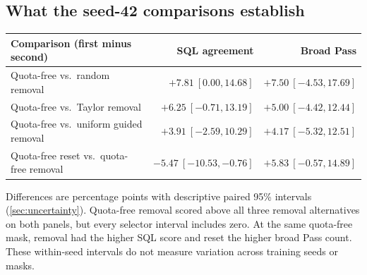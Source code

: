 \documentclass[10pt,letterpaper]{article}
\begin{document}
\subsection{What the seed-42 comparisons establish}
\label{app:paired-comparisons}

\begin{center}
\small
\begin{tabular}{@{}lrr@{}}
\toprule
Comparison (first minus second) & SQL agreement & Broad Pass\\
\midrule
Quota-free vs.\ random removal & $+7.81\ [0.00,14.68]$ & $+7.50\ [-4.53,17.69]$\\
Quota-free vs.\ Taylor removal & $+6.25\ [-0.71,13.19]$ & $+5.00\ [-4.42,12.44]$\\
Quota-free vs.\ uniform guided removal & $+3.91\ [-2.59,10.29]$ & $+4.17\ [-5.32,12.51]$\\
Quota-free reset vs.\ quota-free removal & $-5.47\ [-10.53,-0.76]$ & $+5.83\ [-0.57,14.89]$\\
\bottomrule
\end{tabular}
\end{center}

Differences are percentage points with descriptive paired 95\% intervals
(\autoref{sec:uncertainty}). Quota-free removal scored above all three
removal alternatives on both panels, but every selector interval includes
zero. At the same quota-free mask, removal had the higher SQL score and
reset the higher broad Pass count. These within-seed intervals do not
measure variation across training seeds or masks.
\end{document}
